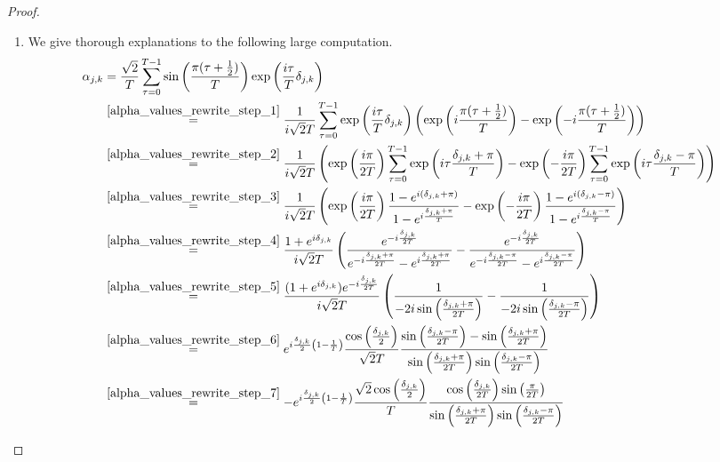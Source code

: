 \begin{proof}
    \begin{enumerate}[label=(\roman*)]
        \item \label{alpha_values_rewrite_1} We give thorough explanations to the following large computation.
        \begin{align}
            \alpha_{j, k} &= \frac{\sqrt{2}}{T} \sum_{\tau = 0}^{T-1} \sin\left(\frac{\pi(\tau+\frac{1}{2})}{T}\right) \exp\left(\frac{i \tau}{T} \delta_{j, k}\right)\\
            &\overset{\ref{alpha_values_rewrite_step_1}}{=} \frac{1}{i\sqrt{2}T} \sum_{\tau = 0}^{T-1} \exp\left(\frac{i\tau}{T}\delta_{j, k}\right)\left(\exp\left(i\frac{\pi(\tau+\frac{1}{2})}{T}\right)-\exp\left(-i\frac{\pi(\tau+\frac{1}{2})}{T}\right)\right)\\
            &\overset{\ref{alpha_values_rewrite_step_2}}{=} \frac{1}{i\sqrt{2}T} \left(\exp\left(\frac{i\pi}{2T}\right)\sum_{\tau = 0}^{T-1}\exp\left(i\tau\frac{\delta_{j, k}+\pi}{T}\right) - \exp\left(-\frac{i\pi}{2T}\right)\sum_{\tau = 0}^{T-1}\exp\left(i\tau\frac{\delta_{j, k}-\pi}{T}\right)\right)\\
            &\overset{\ref{alpha_values_rewrite_step_3}}{=} \frac{1}{i\sqrt{2}T} \left(\exp\left(\frac{i\pi}{2T}\right)\frac{1-e^{i(\delta_{j, k}+\pi)}}{1-e^{i\frac{\delta_{j, k}+\pi}{T}}} - \exp\left(-\frac{i\pi}{2T}\right)\frac{1-e^{i(\delta_{j, k}-\pi)}}{1-e^{i\frac{\delta_{j, k}-\pi}{T}}}\right) \label{special_djk_bounds}\\
            &\overset{\ref{alpha_values_rewrite_step_4}}{=} \frac{1+e^{i\delta_{j, k}}}{i\sqrt{2}T} \left(\frac{e^{-i\frac{\delta_{j, k}}{2T}}}{e^{-i\frac{\delta_{j, k}+\pi}{2T}}-e^{i\frac{\delta_{j, k}+\pi}{2T}}} - \frac{e^{-i\frac{\delta_{j, k}}{2T}}}{e^{-i\frac{\delta_{j, k}-\pi}{2T}}-e^{i\frac{\delta_{j, k}-\pi}{2T}}}\right)\\
            &\overset{\ref{alpha_values_rewrite_step_5}}{=} \frac{(1+e^{i\delta_{j, k}})e^{-i\frac{\delta_{j, k}}{2T}}}{i\sqrt{2}T} \left(\frac{1}{-2i\sin\left(\frac{\delta_{j, k}+\pi}{2T}\right)} - \frac{1}{-2i\sin\left(\frac{\delta_{j, k}-\pi}{2T}\right)}\right)\\
            &\overset{\ref{alpha_values_rewrite_step_6}}{=} e^{i\frac{\delta_{j, k}}{2}\left(1-\frac{1}{T}\right)}\frac{\cos\left(\frac{\delta_{j, k}}{2}\right)}{\sqrt{2}T} \frac{\sin\left(\frac{\delta_{j, k}-\pi}{2T}\right)-\sin\left(\frac{\delta_{j, k}+\pi}{2T}\right)}{\sin\left(\frac{\delta_{j, k}+\pi}{2T}\right)\sin\left(\frac{\delta_{j, k}-\pi}{2T}\right)}\\
            &\overset{\ref{alpha_values_rewrite_step_7}}{=} -e^{i\frac{\delta_{j, k}}{2}\left(1-\frac{1}{T}\right)}\frac{\sqrt{2}\cos\left(\frac{\delta_{j, k}}{2}\right)}{T} \frac{\cos\left(\frac{\delta_{j, k}}{2T}\right)\sin\left(\frac{\pi}{2T}\right)}{\sin\left(\frac{\delta_{j, k}+\pi}{2T}\right)\sin\left(\frac{\delta_{j, k}-\pi}{2T}\right)}
        \end{align}
    

\end{enumerate}
\end{proof}
